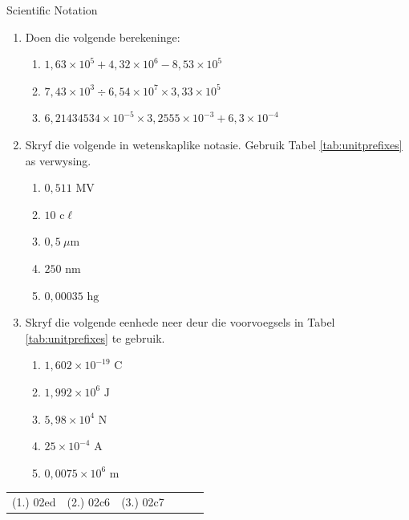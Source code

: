 \vspace{-1cm}
\begin{exercises}{Scientific Notation }
            \nopagebreak \noindent \vspace{-1cm}
\begin{enumerate}[noitemsep, label=\textbf{\arabic*}. ] 
 \item Doen die volgende berekeninge:
    \begin{enumerate}[noitemsep, label=\textbf{\alph*}. ] 
     \item $1,63 \times 10^{5} + 4,32 \times 10^{6} - 8,53 \times 10^{5}$
     \item $7,43 \times 10^{3} \div 6,54 \times 10^{7} \times 3,33 \times 10^{5}$
     \item $6,21434534 \times 10^{-5} \times 3,2555 \times 10^{-3} + 6,3 \times 10^{-4}$
    \end{enumerate}
  \item Skryf die volgende in wetenskaplike notasie. Gebruik Tabel \ref{tab:unitprefixes} as verwysing.
    \begin{enumerate}[noitemsep, label=\textbf{\alph*}. ] 
      \item $0,511 \text{ MV}$
      \item $10 \text{ c}\ell $
      \item $0,5 ~\mu\text{m}$
      \item $250 \text{ nm}$
      \item $0,00035 \text{ hg}$
    \end{enumerate}
  \item Skryf die volgende eenhede neer deur die voorvoegsels in Tabel \ref{tab:unitprefixes} te gebruik.
    \begin{enumerate}[noitemsep, label=\textbf{\alph*}. ] 
      \item $1,602 \times{10}^{-19} \text{ C}$
      \item $1,992 \times{10}^{6} \text { J}$
      \item $5,98 \times{10}^{4} \text{ N}$
      \item $25 \times{10}^{-4} \text{ A}$
      \item $0,0075 \times{10}^{6} \text{ m}$
    \end{enumerate}
\end{enumerate}
\vspace{-.5cm}
 \practiceinfo
  \begin{tabular}[h]{cccccc}
(1.) 02ed & (2.) 02c6  &  (3.) 02c7  & \end{tabular}
\end{exercises}
